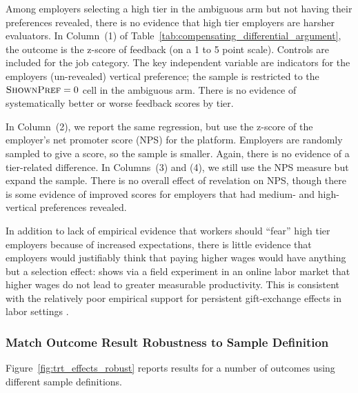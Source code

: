 \documentclass[12pt]{article}
\begin{document}
Among employers selecting a high tier in the ambiguous arm but not having their preferences revealed, there is no evidence that high tier employers are harsher evaluators.
In Column~(1) of Table~\ref{tab:compensating_differential_argument}, the outcome is the z-score of feedback (on a 1 to 5 point scale).
Controls are included for the job category.
The key independent variable are indicators for the employers (un-revealed) vertical preference; the sample is restricted to the $\textsc{ShownPref} = 0$ cell in the ambiguous arm.
There is no evidence of systematically better or worse feedback scores by tier.

In Column~(2), we report the same regression, but use the z-score of the employer's net promoter score (NPS) for the platform.
Employers are randomly sampled to give a score, so the sample is smaller.
Again, there is no evidence of a tier-related difference.
In Columns~(3) and (4), we still use the NPS measure but expand the sample.
There is no overall effect of revelation on NPS, though there is some evidence of improved scores for employers that had medium- and high-vertical preferences revealed. 



In addition to lack of empirical evidence that workers should ``fear'' high tier employers because of increased expectations, there is little evidence that employers would justifiably think that paying higher wages would have anything but a selection effect: 
\cite{gilchrist20163} shows via a field experiment in an online labor market that higher wages do not lead to greater measurable productivity.
This is consistent with the relatively poor empirical support for persistent gift-exchange effects in labor settings \citep{gneezy2006putting}. 


\subsubsection{Match Outcome Result Robustness to Sample Definition} \label{online_app:trt_effects_robust}

Figure~\ref{fig:trt_effects_robust} reports results for a number of outcomes using different sample definitions. 
\end{document}
